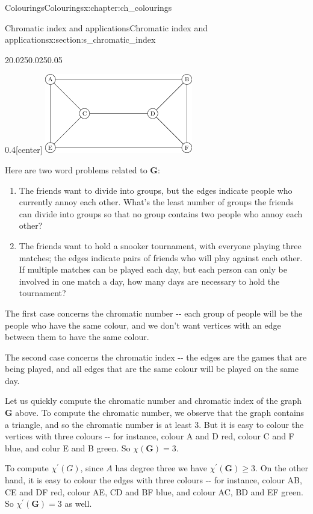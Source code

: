 \documentclass[oneside,10pt,]{book}
\numberwithin{equation}{section}
\newcommand{\bfG}{\mathbf{G}}
\begin{document}
\begin{chapterptx}{Colourings}{}{Colourings}{}{}{x:chapter:ch_colourings}
\begin{sectionptx}{Chromatic index and applications}{}{Chromatic index and applications}{}{}{x:section:s_chromatic_index}
\begin{sidebyside}{2}{0.025}{0.025}{0.05}
\begin{sbspanel}{0.4}[center]
\includegraphics[width=\linewidth]{images/ChromaticNumberVsIndex.png}
\end{sbspanel}%
\end{sidebyside}%
Here are two word problems related to \(\bfG\):%
%
\begin{enumerate}
\item{}The friends want to divide into groups, but the edges indicate people who currently annoy each other.  What's the least number of groups the friends can divide into groups so that no group contains two people who annoy each other?%
\item{}The friends want to hold a snooker tournament, with everyone playing three matches; the edges indicate pairs of friends who will play against each other.  If multiple matches can be played each day, but each person can only be involved in one match a day, how many days are necessary to hold the tournament?%
\end{enumerate}
The first case concerns the chromatic number -{}-{} each group of people will be the people who have the same colour, and we don't want vertices with an edge between them to have the same colour.%
\par
The second case concerns the chromatic index -{}-{} the edges are the games that are being played, and all edges that are the same colour will be played on the same day.%
\par
Let us quickly compute the chromatic number and chromatic index of the graph \(\bfG\) above.  To compute the chromatic number, we observe that the graph contains a triangle, and so the chromatic number is at least 3.  But it is easy to colour the vertices with three colours -{}-{} for instance, colour A and D red, colour C and F blue, and colur E and B green.  So \(\chi(\bfG)=3\).%
\par
To compute \(\chi^\prime(G)\), since \(A\) has degree three we have \(\chi^\prime(\bfG)\geq 3\).  On the other hand, it is easy to colour the edges with three colours -{}-{} for instance, colour AB, CE and DF red, colour AE, CD and BF blue, and colour AC, BD and EF green.  So \(\chi^\prime(\bfG)=3\) as well.%

\end{sectionptx}
\end{chapterptx}
\end{document}
